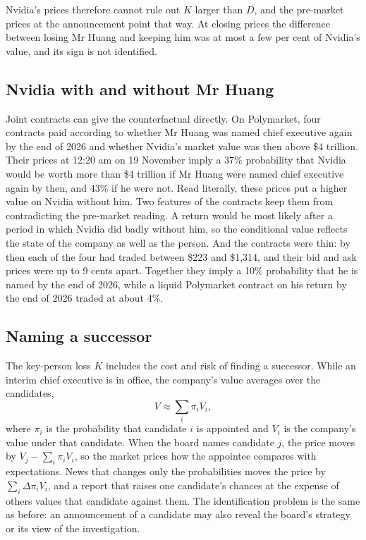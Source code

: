 \documentclass[11pt,a4paper]{article}
\begin{document}
Nvidia's prices therefore cannot rule out $K$ larger than $D$, and the pre-market prices at the announcement point that way. At closing prices the difference between losing Mr Huang and keeping him was at most a few per cent of Nvidia's value, and its sign is not identified.

\subsection{Nvidia with and without Mr Huang}

Joint contracts can give the counterfactual directly. On Polymarket, four contracts paid according to whether Mr Huang was named chief executive again by the end of 2026 and whether Nvidia's market value was then above \$4 trillion. Their prices at 12:20 am on 19 November imply a 37\% probability that Nvidia would be worth more than \$4 trillion if Mr Huang were named chief executive again by then, and 43\% if he were not. Read literally, these prices put a higher value on Nvidia without him. Two features of the contracts keep them from contradicting the pre-market reading. A return would be most likely after a period in which Nvidia did badly without him, so the conditional value reflects the state of the company as well as the person. And the contracts were thin: by then each of the four had traded between \$223 and \$1,314, and their bid and ask prices were up to 9 cents apart. Together they imply a 10\% probability that he is named by the end of 2026, while a liquid Polymarket contract on his return by the end of 2026 traded at about 4\%.

\subsection{Naming a successor}\label{sec:successor}

The key-person loss $K$ includes the cost and risk of finding a successor. While an interim chief executive is in office, the company's value averages over the candidates,
\begin{equation}
V \approx \sum_i \pi_i V_i,
\end{equation}
where $\pi_i$ is the probability that candidate $i$ is appointed and $V_i$ is the company's value under that candidate. When the board names candidate $j$, the price moves by $V_j - \sum_i \pi_i V_i$, so the market prices how the appointee compares with expectations. News that changes only the probabilities moves the price by $\sum_i \Delta\pi_i V_i$, and a report that raises one candidate's chances at the expense of others values that candidate against them. The identification problem is the same as before: an announcement of a candidate may also reveal the board's strategy or its view of the investigation.
\end{document}
